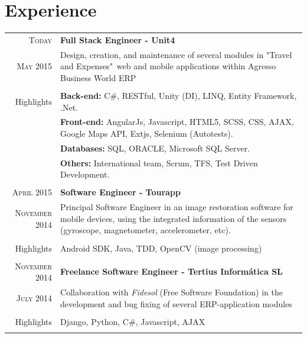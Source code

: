 \documentclass[a4paper,10pt]{article} %
\newcommand{\highlights}{\textcolor{linkcolour}{Highlights}}
\begin{document}
\section{Experience}

\begin{tabular}{r|p{11cm}}

\textsc{Today} & \textbf{Full Stack Engineer - Unit4} \\
\textsc{May 2015} 
& \small{Design, creation, and maintenance of several modules in "Travel and
Expenses"\  web and mobile applications within Agresso Business World ERP}  \\
& \\
\highlights & \textbf{Back-end:} C\#, RESTful, Unity (DI),
LINQ, Entity Framework, .Net. \\
& \textbf{Front-end:} AngularJs, Javascript, HTML5, SCSS, CSS,
AJAX, Google Maps API, Extjs, Selenium (Autotests). \\  
& \textbf{Databases:} SQL, ORACLE, Microsoft SQL Server. \\
& \textbf{Others:} International team, Scrum, TFS, Test Driven
Development. \\
\multicolumn{2}{c}{} \\


\textsc{April 2015} & \textbf{Software Engineer - Tourapp} \\
\textsc{November 2014}
& \footnotesize{Principal Software Engineer in an image restoration software for
mobile devices, using the integrated information of the sensors
(gyroscope, magnetometer, accelerometer, etc).}  \\
           & \\
\highlights & Android SDK, Java, TDD, OpenCV (image
processing)\\

\multicolumn{2}{c}{} \\


\textsc{November 2014} & \textbf{Freelance Software Engineer - Tertius
Informática SL} \\
\textsc{July 2014} 
           & \footnotesize{Collaboration with \textit{Fidesol} (Free Software
  Foundation) in the development and bug fixing of several ERP-application modules} \\
           & \\
\highlights & Django, Python, C\#, Javascript, AJAX \\

\multicolumn{2}{c}{} \\


\end{tabular}
\end{document}
